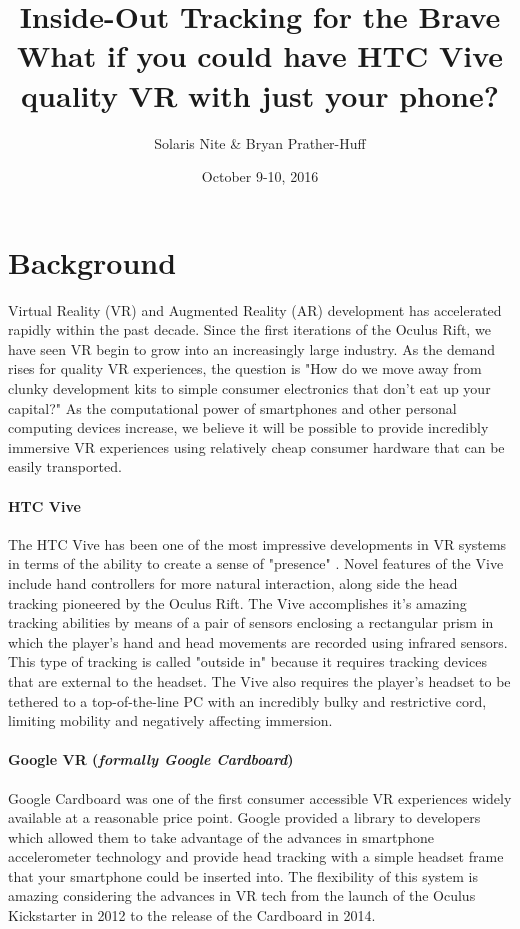 \documentclass{report}
\title{Inside-Out Tracking for the Brave \\ \small{What if you could have HTC Vive quality VR with just your phone?}}
\author{Solaris Nite \& Bryan Prather-Huff}
\date{October 9-10, 2016}
\begin{document}
	\maketitle
	
	\section*{Background}
	Virtual Reality (VR) and Augmented Reality (AR) development has accelerated rapidly within the past decade. Since the first iterations of the Oculus Rift, we have seen VR begin to grow into an increasingly large industry. As the demand rises for quality VR experiences, the question is "How do we move away from clunky development kits to simple consumer electronics that don't eat up your capital?" As the computational power of smartphones and other personal computing devices increase, we believe it will be possible to provide incredibly immersive VR experiences using relatively cheap consumer hardware that can be easily transported.
	
	\paragraph*{HTC Vive}
	The HTC Vive has been one of the most impressive developments in VR systems in terms of the ability to create a sense of "presence" . Novel features of the Vive include hand controllers for more natural interaction, along side the head tracking pioneered by the Oculus Rift. The Vive accomplishes it's amazing tracking abilities by means of a pair of sensors enclosing a rectangular prism in which the player's hand and head movements are recorded using infrared sensors. This type of tracking is called "outside in" because it requires tracking devices that are external to the headset. The Vive also requires the player's headset to be tethered to a top-of-the-line PC with an incredibly bulky and restrictive cord, limiting mobility and negatively affecting immersion.
	
	\paragraph*{Google VR (\textit{formally Google Cardboard})}
	Google Cardboard was one of the first consumer accessible VR experiences widely available at a reasonable price point. Google provided a library to developers which allowed them to take advantage of the advances in smartphone accelerometer technology and provide head tracking with a simple headset frame that your smartphone could be inserted into. The flexibility of this system is amazing considering the advances in VR tech from the launch of the Oculus Kickstarter in 2012 to the release of the Cardboard in 2014.
	
\end{document}
